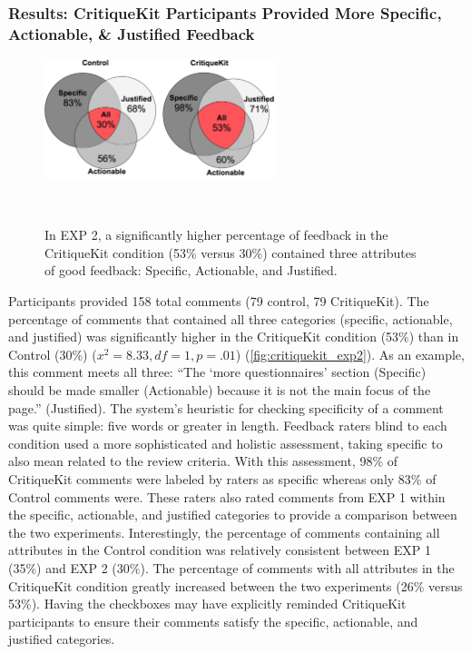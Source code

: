 \subsubsection{Results: CritiqueKit Participants Provided More Specific, Actionable, \& Justified Feedback}
\begin{figure}[b!]
\centering
  \includegraphics[width=0.6\textwidth]{critiquekit/figures/venn_diagram_exp2.png}
  \caption{In EXP 2, a significantly higher percentage of feedback in the CritiqueKit condition (53\% versus 30\%) contained three attributes of good feedback: Specific, Actionable, and Justified.}~\label{fig:critiquekit_exp2}
\end{figure}

Participants provided 158 total comments (79 control, 79 CritiqueKit). The percentage of comments that contained all three categories (specific, actionable, and justified) was significantly higher in the CritiqueKit condition (53\%) than in Control (30\%) ($x^2=8.33, df = 1, p = .01$) (\autoref{fig:critiquekit_exp2}). As an example, this comment meets all three: ``The `more questionnaires' section (Specific) should be made smaller (Actionable) because it is not the main focus of the page.'' (Justified). The system's heuristic for checking specificity of a comment was quite simple: five words or greater in length. Feedback raters blind to each condition used a more sophisticated and holistic assessment, taking specific to also mean related to the review criteria. With this assessment, 98\% of CritiqueKit comments were labeled by raters as specific whereas only 83\% of Control comments were. These raters also rated comments from EXP 1 within the specific, actionable, and justified categories to provide a comparison between the two experiments. Interestingly, the percentage of comments containing all attributes in the Control condition was relatively consistent between EXP 1 (35\%) and EXP 2 (30\%). The percentage of comments with all attributes in the CritiqueKit condition greatly increased between the two experiments (26\% versus 53\%). Having the checkboxes may have explicitly reminded CritiqueKit participants to ensure their comments satisfy the specific, actionable, and justified categories.

